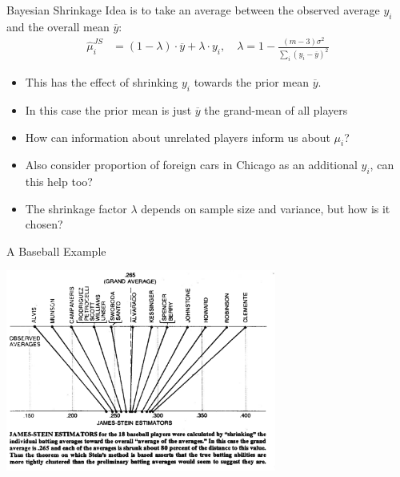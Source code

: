 \documentclass[aspectratio=169]{beamer}
\begin{document}
\begin{frame}[fragile]{Bayesian Shrinkage}
Idea is to take an average between the observed average $y_i$ and the overall mean $\overline{y}$:
\begin{align*}
\widehat{\mu}_i^{JS} &=  (1-\lambda) \cdot \overline{y}  + \lambda \cdot y_i, \quad
\lambda = 1 - \frac{(m-3) \sigma^2}{\sum_i( y_i - \overline{y})^2}
\end{align*}
\begin{itemize}
\item This has the effect of \alert{shrinking} $y_i$ towards the \alert{prior mean} $\overline{y}$.
\item In this case the \alert{prior mean} is just $\overline{y}$ the grand-mean of all players
\item How can information about unrelated players inform us about $\mu_i$?
\item Also consider proportion of foreign cars in Chicago as an additional $y_i$, can this help too?
\item The \alert{shrinkage factor} $\lambda$ depends on sample size and variance, but how is it chosen?
\end{itemize}
\end{frame}



\begin{frame}[fragile]{A Baseball Example}
\begin{center}
\includegraphics[width=3.5in]{./resources/baseball2.png}
\end{center}
\end{frame}
\end{document}
